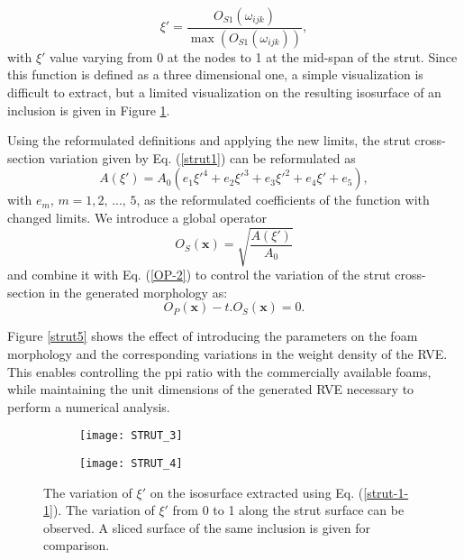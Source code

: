 \begin{equation}\label{strut-1-1}
\xi'=\frac{O_{S1}(\omega_{ijk})}{\max(O_{S1}(\omega_{ijk}))},
\end{equation}
with $ \xi' $ value varying from 0 at the nodes to 1 at the mid-span of the strut. Since this function is defined as a three dimensional one, a simple visualization is difficult to extract, but a limited visualization on the resulting isosurface of an inclusion is given in Figure \ref{strut6}.

Using the reformulated definitions and applying the new limits, the strut cross-section variation given by Eq. (\ref{strut1}) can be reformulated as
\begin{equation}
A(\xi')=A_0(e_1\xi'^4+e_2\xi'^3+e_3\xi'^2+e_4\xi'+e_5)\label{strut},
\end{equation}
with $ e_m $, $ m=1,2,\,...,\,5 $, as the reformulated coefficients of the function with changed limits. We introduce a global operator
\begin{equation}
O_S(\textbf{x}) = \sqrt{\frac{A(\xi')}{A_0}}\label{strut-operator}
\end{equation}
and combine it with Eq. (\ref{OP-2}) to control the variation of the strut cross-section in the generated morphology as:
\begin{equation}
O_P(\textbf{x})-t.O_S(\textbf{x})=0.\label{strut7}
\end{equation}

Figure \ref{strut5} shows the effect of introducing the parameters on the foam morphology and the corresponding variations in the weight density of the RVE. This enables controlling the ppi ratio with the commercially available foams, while maintaining the unit dimensions of the generated RVE necessary to perform a numerical analysis.

\begin{figure}
	\centering
	\begin{subfigure}[b]{0.45\textwidth}
		\texttt{[image: STRUT\_3]}
		\caption{}
	\end{subfigure}
	\begin{subfigure}[b]{0.45\textwidth}
		\texttt{[image: STRUT\_4]}
		\caption{}
	\end{subfigure}

	\caption{The variation of $ \xi' $ on the isosurface extracted using Eq. (\ref{strut-1-1}). The variation of $ \xi' $ from 0 to 1 along the strut surface can be observed. A sliced surface of the same inclusion is given for comparison. }\label{strut6}
\end{figure}

